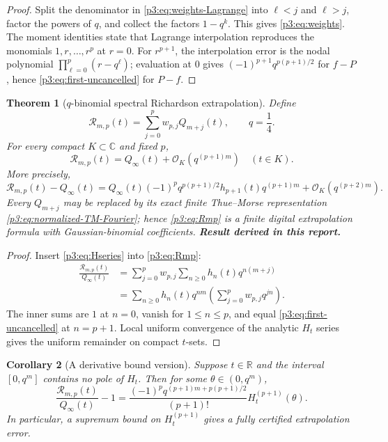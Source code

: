 \documentclass[11pt,oneside]{article}
\numberwithin{equation}{section}
\newtheorem{theorem}{Theorem}[section]
\newtheorem{corollary}[theorem]{Corollary}
\theoremstyle{definition}
\theoremstyle{remark}
\newcommand{\R}{\mathbb R}
\newcommand{\C}{\mathbb C}
\newcommand{\bigO}{\mathcal O}
\newcommand{\newresult}{\textbf{Result derived in this report.}}
\begin{document}
\begin{proof}
Split the denominator in \eqref{p3:eq:weights-Lagrange} into $\ell<j$ and $\ell>j$, factor the
powers of $q$, and collect the factors $1-q^k$.  This gives \eqref{p3:eq:weights}.  The moment
identities state that Lagrange interpolation reproduces the monomials $1,r,\ldots,r^p$ at
$r=0$.  For $r^{p+1}$, the interpolation error is the nodal polynomial
$\prod_{\ell=0}^{p}(r-q^\ell)$; evaluation at $0$ gives
$(-1)^{p+1}q^{p(p+1)/2}$ for $f-P$, hence \eqref{p3:eq:first-uncancelled} for $P-f$.
\end{proof}

\begin{theorem}[$q$-binomial spectral Richardson extrapolation]
\label{p3:thm:qRichardson}
Define
\begin{equation}
 \mathcal R_{m,p}(t)=\sum_{j=0}^{p}w_{p,j}Q_{m+j}(t),
 \qquad q=\frac14.
 \label{p3:eq:Rmp}
\end{equation}
For every compact $K\subset\C$ and fixed $p$,
\begin{equation}
 \boxed{
 \mathcal R_{m,p}(t)=Q_\infty(t)+\bigO_K(q^{(p+1)m})
 \quad(t\in K).}
 \label{p3:eq:Richardson-order}
\end{equation}
More precisely,
\begin{equation}
 \mathcal R_{m,p}(t)-Q_\infty(t)
 =Q_\infty(t)(-1)^pq^{p(p+1)/2}h_{p+1}(t)q^{(p+1)m}
 +\bigO_K(q^{(p+2)m}).
 \label{p3:eq:Richardson-leading}
\end{equation}
Every $Q_{m+j}$ may be replaced by its exact finite Thue--Morse representation
\eqref{p3:eq:normalized-TM-Fourier}; hence \eqref{p3:eq:Rmp} is a finite digital extrapolation
formula with Gaussian-binomial coefficients.
\newresult
\end{theorem}

\begin{proof}
Insert \eqref{p3:eq:Hseries} into \eqref{p3:eq:Rmp}:
\begin{align*}
 \frac{\mathcal R_{m,p}(t)}{Q_\infty(t)}
 &=\sum_{j=0}^{p}w_{p,j}\sum_{n\ge0}h_n(t)q^{n(m+j)}\\
 &=\sum_{n\ge0}h_n(t)q^{nm}
   \left(\sum_{j=0}^{p}w_{p,j}q^{jn}\right).
\end{align*}
The inner sums are $1$ at $n=0$, vanish for $1\le n\le p$, and equal
\eqref{p3:eq:first-uncancelled} at $n=p+1$.  Local uniform convergence of the analytic $H_t$
series gives the uniform remainder on compact $t$-sets.
\end{proof}

\begin{corollary}[A derivative bound version]
\label{p3:cor:Richardson-bound}
Suppose $t\in\R$ and the interval $[0,q^m]$ contains no pole of $H_t$.  Then for some
$\theta\in(0,q^m)$,
\begin{equation}
 \frac{\mathcal R_{m,p}(t)}{Q_\infty(t)}-1
 =\frac{(-1)^pq^{(p+1)m+p(p+1)/2}}{(p+1)!}
 H_t^{(p+1)}(\theta).
 \label{p3:eq:Richardson-remainder}
\end{equation}
In particular, a supremum bound on $H_t^{(p+1)}$ gives a fully certified extrapolation error.
\end{corollary}
\end{document}

